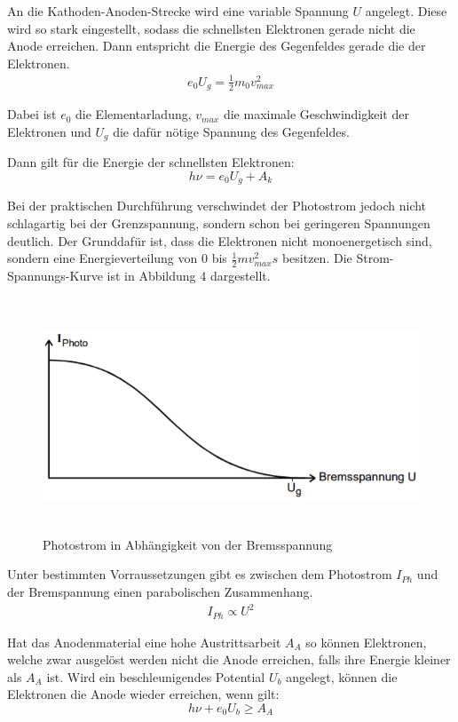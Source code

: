 An die Kathoden-Anoden-Strecke wird eine variable Spannung $U$ angelegt. Diese wird so stark eingestellt, sodass die
schnellsten Elektronen gerade nicht die Anode erreichen. Dann entspricht die Energie des Gegenfeldes gerade die der Elektronen.
\begin{align}
  e_0 U_g = \frac{1}{2} m_0 v_{max}^2
\end{align}

Dabei ist $e_0$ die Elementarladung, $v_{max}$ die maximale Geschwindigkeit der Elektronen und $U_g$ die dafür nötige
Spannung des Gegenfeldes.

Dann gilt für die Energie der schnellsten Elektronen:
\begin{equation}
  h \nu = e_0 U_g  + A_k
\end{equation}

Bei der praktischen Durchführung verschwindet der Photostrom jedoch nicht schlagartig bei der Grenzspannung, sondern schon
bei geringeren Spannungen deutlich. Der Grunddafür ist, dass die Elektronen nicht monoenergetisch sind, sondern eine
Energieverteilung von $0$ bis $\frac{1}{2} m v_{max}^2s$ besitzen.
Die Strom-Spannungs-Kurve ist in Abbildung 4 dargestellt.

\begin{figure}[H]
  \centering
  \includegraphics[height=7cm]{fermi.PNG}
  \caption{Photostrom in Abhängigkeit von der Bremsspannung}
  \label{fig:kathode}
\end{figure}

Unter bestimmten Vorraussetzungen gibt es zwischen dem Photostrom $I_{Ph}$ und der Bremspannung einen parabolischen Zusammenhang.
\begin{align*}
  I_{Ph} \propto U^2
\end{align*}


Hat das Anodenmaterial eine hohe Austrittsarbeit $A_A$ so können Elektronen, welche zwar ausgelöst werden nicht die
Anode erreichen, falls ihre Energie kleiner als $A_A$ ist. Wird ein beschleunigendes Potential $U_b$ angelegt, können
die Elektronen die Anode wieder erreichen, wenn gilt:
\begin{equation}
  h \nu + e_0 U_b \geq A_A
\end{equation}
